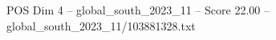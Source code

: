 \begin{textsample}{POS Dim 4 – global\_south\_2023\_11 – Score 22.00 – global\_south\_2023\_11/103881328.txt}
\end{textsample}
